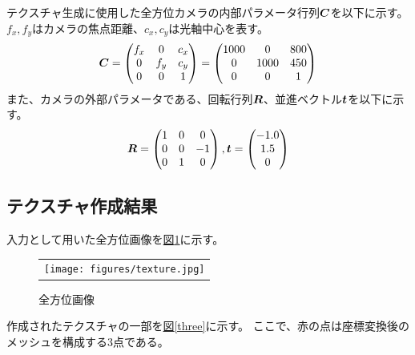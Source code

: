 \documentclass[]{jarticle}          %
\begin{document}
テクスチャ生成に使用した全方位カメラの内部パラメータ行列$\mbox{\boldmath $C$}$を以下に示す。
$f_x,f_y$はカメラの焦点距離、$c_x,c_y$は光軸中心を表す。
\begin{equation}
  \mbox{\boldmath $C$} = 
  \begin{pmatrix}
    f_x & 0 & c_x \\
    0 & f_y & c_y \\
    0 & 0 & 1 \\
  \end{pmatrix}
  =
  \begin{pmatrix}
    1000 & 0 & 800 \\
    0 & 1000 & 450 \\
    0 & 0 & 1 \\
  \end{pmatrix}
\end{equation}
また、カメラの外部パラメータである、回転行列$\mbox{\boldmath $R$}$、並進ベクトル$\mbox{\boldmath $t$}$を以下に示す。
\begin{equation}
  \mbox{\boldmath $R$} = 
  \begin{pmatrix}
    1 & 0 & 0 \\
    0 & 0 & -1 \\
    0 & 1 & 0 \\
  \end{pmatrix}
  ,
  \mbox{\boldmath $t$} =
  \begin{pmatrix}
    -1.0 \\
    1.5 \\
    0 \\
  \end{pmatrix}
\end{equation}


\subsection{テクスチャ作成結果}
入力として用いた全方位画像を\hyperref[two]{図\ref{two}}に示す。
\begin{figure}[!ht]
  \begin{center}
    \begin{tabular}{c}
      \texttt{[image: figures/texture.jpg]}
    \end{tabular}
  \end{center}
  \caption{全方位画像}
  \label{two}
\end{figure}

\newpage

作成されたテクスチャの一部を\hyperref[three]{図\ref{three}}に示す。
ここで、赤の点は座標変換後のメッシュを構成する3点である。
\end{document}
